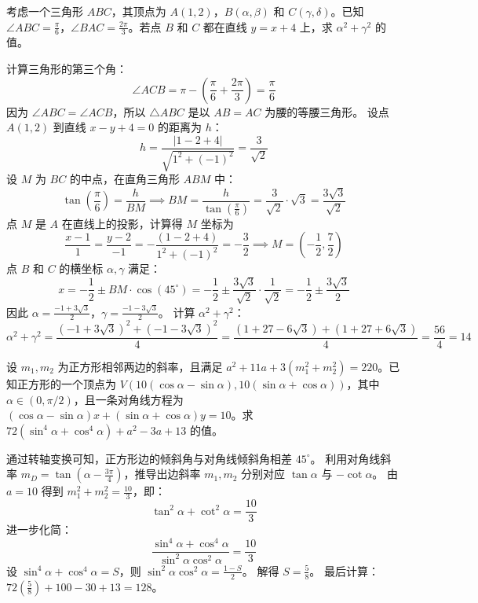 \begin{questions}
\question
考虑一个三角形 $ABC$，其顶点为 $A(1, 2)$，$B(\alpha, \beta)$ 和 $C(\gamma, \delta)$。已知 $\angle ABC = \frac{\pi}{6}$，$\angle BAC = \frac{2\pi}{3}$。若点 $B$ 和 $C$ 都在直线 $y = x + 4$ 上，求 $\alpha^2 + \gamma^2$ 的值。
\begin{solution}
计算三角形的第三个角：
\[
\angle ACB = \pi - \left( \frac{\pi}{6} + \frac{2\pi}{3} \right) = \frac{\pi}{6}
\]
因为 $\angle ABC = \angle ACB$，所以 $\triangle ABC$ 是以 $AB=AC$ 为腰的等腰三角形。
设点 $A(1, 2)$ 到直线 $x - y + 4 = 0$ 的距离为 $h$：
\[
h = \frac{|1 - 2 + 4|}{\sqrt{1^2 + (-1)^2}} = \frac{3}{\sqrt{2}}
\]
设 $M$ 为 $BC$ 的中点，在直角三角形 $ABM$ 中：
\[
\tan \left( \frac{\pi}{6} \right) = \frac{h}{BM} \implies BM = \frac{h}{\tan(\frac{\pi}{6})} = \frac{3}{\sqrt{2}} \cdot \sqrt{3} = \frac{3\sqrt{3}}{\sqrt{2}}
\]
点 $M$ 是 $A$ 在直线上的投影，计算得 $M$ 坐标为 
$$\frac{x-1}{1} = \frac{y-2}{-1} = -\frac{(1-2+4)}{1^2+(-1)^2} = -\frac{3}{2} \implies M = \left(-\frac{1}{2}, \frac{7}{2}\right)$$
点 $B$ 和 $C$ 的横坐标 $\alpha, \gamma$ 满足：
\[
x = -\frac{1}{2} \pm BM \cdot \cos(45^\circ) = -\frac{1}{2} \pm \frac{3\sqrt{3}}{\sqrt{2}} \cdot \frac{1}{\sqrt{2}} = -\frac{1}{2} \pm \frac{3\sqrt{3}}{2}
\]
因此 $\alpha = \frac{-1 + 3\sqrt{3}}{2}$，$\gamma = \frac{-1 - 3\sqrt{3}}{2}$。
计算 $\alpha^2 + \gamma^2$：
\[
\alpha^2 + \gamma^2 = \frac{(-1 + 3\sqrt{3})^2 + (-1 - 3\sqrt{3})^2}{4} = \frac{(1 + 27 - 6\sqrt{3}) + (1 + 27 + 6\sqrt{3})}{4} = \frac{56}{4} = 14
\]
\end{solution}
\question
设 $m_1, m_2$ 为正方形相邻两边的斜率，且满足 $a^2 + 11a + 3(m_1^2 + m_2^2) = 220$。已知正方形的一个顶点为 $V(10(\cos \alpha - \sin \alpha), 10(\sin \alpha + \cos \alpha))$，其中 $\alpha \in (0, \pi/2)$，且一条对角线方程为 $(\cos \alpha - \sin \alpha)x + (\sin \alpha + \cos \alpha)y = 10$。求 $72(\sin^4 \alpha + \cos^4 \alpha) + a^2 - 3a + 13$ 的值。
\begin{solution}
通过转轴变换可知，正方形边的倾斜角与对角线倾斜角相差 $45^\circ$。
利用对角线斜率 $m_D = \tan(\alpha - \frac{3\pi}{4})$，推导出边斜率 $m_1, m_2$ 分别对应 $\tan \alpha$ 与 $-\cot \alpha$。
由 $a=10$ 得到 $m_1^2 + m_2^2 = \frac{10}{3}$，即：
\[ \tan^2 \alpha + \cot^2 \alpha = \frac{10}{3} \]
进一步化简：
\[ \frac{\sin^4 \alpha + \cos^4 \alpha}{\sin^2 \alpha \cos^2 \alpha} = \frac{10}{3} \]
设 $\sin^4 \alpha + \cos^4 \alpha = S$，则 $\sin^2 \alpha \cos^2 \alpha = \frac{1-S}{2}$。
解得 $S = \frac{5}{8}$。
最后计算：$72(\frac{5}{8}) + 100 - 30 + 13 = 128$。
\end{solution}


\end{questions}
